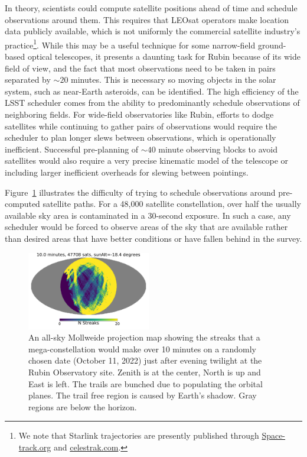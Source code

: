 \documentclass[twocolumn,trackchanges]{aastex63}
\begin{document}
In theory, scientists could compute satellite positions ahead of time and schedule observations around them. This requires that LEOsat operators make location data publicly available, which is not uniformly the commercial satellite industry’s practice\footnote{We note that Starlink trajectories are presently published through \url{Space-track.org} and \url{celestrak.com}.}. While this may be a useful technique for some narrow-field ground-based optical telescopes, it presents a daunting task for Rubin because of its wide field of view, and the fact that most observations need to be taken in pairs separated by $\sim20$ minutes. This is necessary so moving objects in the solar system, such as near-Earth asteroids, can be identified. The high efficiency of the LSST scheduler comes from the ability to predominantly schedule observations of neighboring fields. For wide-field observatories like Rubin, efforts to dodge satellites while continuing to gather pairs of observations would require the scheduler to plan longer slews between observations, which is operationally inefficient. Successful pre-planning of $\sim40$ minute observing blocks to avoid satellites would also require a very precise kinematic model of the telescope or including larger inefficient overheads for slewing between pointings.

Figure~\ref{fig:sat_steps} illustrates the difficulty of trying to schedule observations around pre-computed satellite paths. For a 48,000 satellite constellation, over half the usually available sky area is contaminated in a 30-second exposure. In such a case, any scheduler would be forced to observe areas of the sky that are available rather than desired areas that have better conditions or have fallen behind in the survey.

\begin{figure}
    \centering
    \includegraphics[width=0.48\textwidth]{tenmin_example.pdf}
    \caption{An all-sky Mollweide projection map showing the streaks that a mega-constellation would make over 10 minutes on a randomly chosen date (October 11, 2022) just after evening twilight at the Rubin Observatory site. Zenith is at the center, North is up and East is left. The trails are bunched due to populating the orbital planes. The trail free region is caused by Earth’s shadow. Gray regions are below the horizon.
 }
    \label{fig:sat_steps}
\end{figure}
\end{document}
